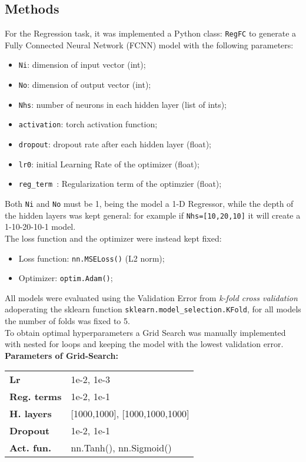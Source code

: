 \documentclass[11pt,a4paper,twocolumn]{IEEEtran}
\newcommand{\thinsepline}{\noindent\makebox[\linewidth]{\rule{7.5cm}{0.02pt}}}
\begin{document}
			\subsection{\textbf{Methods}}
			For the Regression task, it was implemented a Python class: \texttt{RegFC} to generate a Fully Connected Neural Network (FCNN) model with the following parameters:
			\begin{itemize}
				\item \texttt{Ni}: dimension of input vector (int);
				\item \texttt{No}: dimension of output vector (int);
				\item \texttt{Nhs}: number of neurons in each hidden layer (list of ints);
				\item \texttt{activation}: torch activation function;
				\item \texttt{dropout}: dropout rate after each hidden layer (float);
				\item \texttt{lr0}: initial Learning Rate of the optimizer (float);
				\item \texttt{reg\_term }: Regularization term of the optimzier (float);
			\end{itemize}
			Both \texttt{Ni} and \texttt{No} must be 1, being the model a 1-D Regressor, while the depth of the hidden layers was kept general: for example if \texttt{Nhs=[10,20,10]} it will create a 1-10-20-10-1 model.\medskip\\
			The loss function and the optimizer were instead kept fixed:
			\begin{itemize}
				\item Loss function: \texttt{nn.MSELoss()} (L2 norm);
				\item Optimizer: \texttt{optim.Adam()};
			\end{itemize}
			All models were evaluated using the Validation Error from \textit{k-fold cross validation} adoperating the sklearn function \texttt{sklearn.model\_selection.KFold}, for all models the number of folds was fixed to 5.\\
			To obtain optimal hyperparameters a Grid Search was manually implemented with nested for loops and keeping the model with the lowest validation error.
			\thinsepline\\
			\textbf{Parameters of Grid-Search:}\medskip\\
			\begin{tabular}{ll}
			\textbf{Lr}	& 1e-2, 1e-3 \\
			\textbf{Reg. terms}	& 1e-2, 1e-1 \\
			\textbf{H. layers} & [1000,1000], [1000,1000,1000] \\
			\textbf{Dropout} & 1e-2, 1e-1 \\
			\textbf{Act. fun.} & nn.Tanh(), nn.Sigmoid()
			\end{tabular}
			\thinsepline
\end{document}
